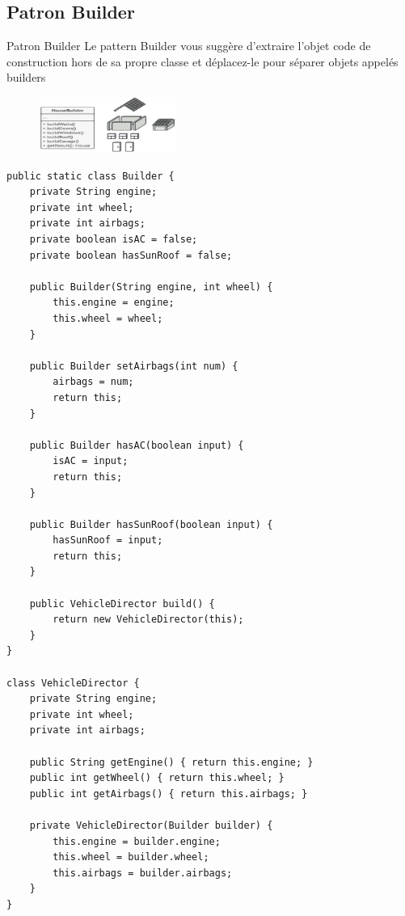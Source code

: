 \documentclass[16pt]{report}
\begin{document}
\begin{multicols*}{2}
        \section{Patron Builder}


        \begin{Concept}{Patron Builder}{}
            Le pattern Builder vous suggère d'extraire l'objet code
            de construction hors de sa propre classe et déplacez-le pour
            séparer objets appelés builders
        \end{Concept}   


        \begin{figure}[H]
            \begin{center}
                \includegraphics[width=0.40\textwidth]{PatronBuilder.png}
            \end{center}
        \end{figure}


\begin{lstlisting}[style=JavaDraculaWhite]
public static class Builder {
    private String engine;
    private int wheel;
    private int airbags;
    private boolean isAC = false;
    private boolean hasSunRoof = false;

    public Builder(String engine, int wheel) {
        this.engine = engine;
        this.wheel = wheel;
    }

    public Builder setAirbags(int num) {
        airbags = num;
        return this;
    }

    public Builder hasAC(boolean input) {
        isAC = input;
        return this;
    }

    public Builder hasSunRoof(boolean input) {
        hasSunRoof = input;
        return this;
    }

    public VehicleDirector build() {
        return new VehicleDirector(this);
    }
}

class VehicleDirector {
    private String engine;
    private int wheel;
    private int airbags;

    public String getEngine() { return this.engine; }
    public int getWheel() { return this.wheel; }
    public int getAirbags() { return this.airbags; }

    private VehicleDirector(Builder builder) {
        this.engine = builder.engine;
        this.wheel = builder.wheel;
        this.airbags = builder.airbags;
    }
}


\end{lstlisting}
\end{multicols*}
\end{document}
